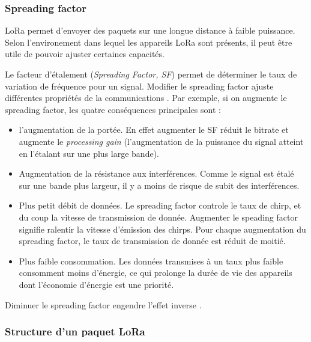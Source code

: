 \subsubsection{Spreading factor}

LoRa permet d'envoyer des paquets sur une longue distance à faible puissance. Selon l'environement dans lequel les appareils LoRa sont présents, il peut être utile de pouvoir ajuster certaines capacités.

\vspace{0.1cm}

Le facteur d'étalement (\textit{Spreading Factor, SF}) permet de déterminer le taux de variation de fréquence pour un signal. Modifier le spreading factor ajuste différentes propriétés de la communications \cite{thethingsnetworkSF}. Par exemple, si on augmente le spreading factor, les quatre conséquences principales sont :

\vspace{0.1cm}

\begin{itemize}
\item l'augmentation de la portée. En effet augmenter le SF réduit le bitrate et augmente le \textit{processing gain} (l'augmentation de la puissance du signal atteint en l'étalant sur une plus large bande).
\item Augmentation de la résistance aux interférences. Comme le signal est étalé sur une bande plus largeur, il y a moins de risque de subit des interférences.
\item Plus petit débit de données. Le spreading factor controle le taux de chirp, et du coup la vitesse de transmission de donnée. Augmenter le speading factor signifie ralentir la vitesse d'émission des chirps. Pour chaque augmentation du spreading factor, le taux de transmission de donnée est réduit de moitié.
\item Plus faible consommation. Les données transmises à un taux plus faible consomment moins d'énergie, ce qui prolonge la durée de vie des appareils dont l'économie d'énergie est une priorité.
\end{itemize}

Diminuer le spreading factor engendre l'effet inverse \cite{thethingsnetworkSF}.

\newpage

\subsubsection{Structure d'un paquet LoRa}\label{packetlora}

